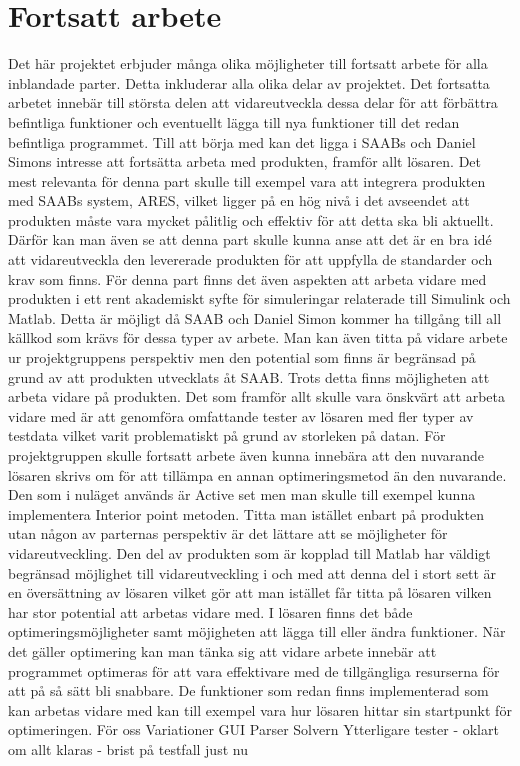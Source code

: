 \section{Fortsatt arbete}
Det här projektet erbjuder många olika möjligheter till fortsatt arbete för alla inblandade parter. Detta inkluderar alla olika delar av projektet. Det fortsatta arbetet innebär till största delen att vidareutveckla dessa delar för att förbättra befintliga funktioner och eventuellt lägga till nya funktioner till det redan befintliga programmet. 
\newline \newline
Till att börja med kan det ligga i SAABs och Daniel Simons intresse att fortsätta arbeta med produkten, framför allt lösaren. Det mest relevanta för denna part skulle till exempel vara att integrera produkten med SAABs system, ARES, vilket ligger på en hög nivå i det avseendet att produkten måste vara mycket pålitlig och effektiv för att detta ska bli aktuellt. Därför kan man även se att denna part skulle kunna anse att det är en bra idé att vidareutveckla den levererade produkten för att uppfylla de standarder och krav som finns. För denna part finns det även aspekten att arbeta vidare med produkten i ett rent akademiskt syfte för simuleringar relaterade till Simulink och Matlab. Detta är möjligt då SAAB och Daniel Simon kommer ha tillgång till all källkod som krävs för dessa typer av arbete.
\newline \newline
Man kan även titta på vidare arbete ur projektgruppens perspektiv men den potential som finns är begränsad på grund av att produkten utvecklats åt SAAB. Trots detta finns möjligheten att arbeta vidare på produkten. Det som framför allt skulle vara önskvärt att arbeta vidare med är att genomföra omfattande tester av lösaren med fler typer av testdata vilket varit problematiskt på grund av storleken på datan. För projektgruppen skulle fortsatt arbete även kunna innebära att den nuvarande lösaren skrivs om för att tillämpa en annan optimeringsmetod än den nuvarande. Den som i nuläget används är Active set men man skulle till exempel kunna implementera Interior point metoden.
\newline \newline
Titta man istället enbart på produkten utan någon av parternas perspektiv är det lättare att se möjligheter för vidareutveckling. Den del av produkten som är kopplad till Matlab har väldigt begränsad möjlighet till vidareutveckling i och med att denna del i stort sett är en översättning av lösaren vilket gör att man istället får titta på lösaren vilken har stor potential att arbetas vidare med. I lösaren finns det både optimeringsmöjligheter samt möjigheten att lägga till eller ändra funktioner. När det gäller optimering kan man tänka sig att vidare arbete innebär att programmet optimeras för att vara effektivare med de tillgängliga resurserna för att på så sätt bli snabbare. De funktioner som redan finns implementerad som kan arbetas vidare med kan till exempel vara hur lösaren hittar sin startpunkt för optimeringen.
\newline \newline
För oss \newline
Variationer \newline
GUI \newline
Parser \newline
Solvern \newline
Ytterligare tester - oklart om allt klaras - brist på testfall just nu \newline